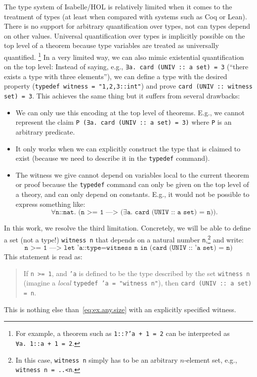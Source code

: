 \documentclass[11pt,a4paper]{article}
\begin{document}
The type system of Isabelle/HOL is relatively limited when it comes to the treatment of types (at least when compared with systems such as Coq or Lean).
There is no support for arbitrary quantification over types, not can types depend on other values.
Universal quantification over types is implicitly possible on the top level of a theorem because type variables are treated as universally quantified.%
\footnote{For example, a theorem such as \texttt{1::?'a + 1 = 2} can be interpreted as \texttt{∀a.~1::a + 1 = 2}.}
In a very limited way, we can also mimic existential quantification on the top level:
Instead of saying, e.g., \texttt{∃a.~card (UNIV :: a set) = 3} (``there exists a type with three elements''),
we can define a type with the desired property (\texttt{typedef witness = "{1,2,3::int}"}) and prove \texttt{card (UNIV :: witness set) = 3}. This achieves the same thing but it suffers from several drawbacks:
\begin{itemize}
\item We can only use this encoding at the top level of theorems. E.g., we cannot represent the claim \texttt{P (∃a.~card (UNIV :: a set) = 3)} where \texttt{P} is an arbitrary predicate.
\item It only works when we can explicitly construct the type that is claimed to exist (because we need to describe it in the \texttt{typedef} command).
\item The witness we give cannot depend on variables local to the current theorem or proof because the \texttt{typedef} command can only be given on the top level of a theory, and can only depend on constants.
  E.g., it would not be possible to express something like:
  \begin{equation}\label{eq:ex.any.size}
    \texttt{∀n::nat. (n >= 1 ---> (∃a.~card (UNIV :: a set) = n))}.
  \end{equation}
\end{itemize}
In this work, we resolve the third limitation.
Concretely, we will be able to define a set (not a type!) \texttt{witness n} that depends on a natural number \texttt{n},\footnote{In this case, \texttt{witness n} simply has to be an arbitrary $n$-element set, e.g., \texttt{witness n = {..<n}}.}
and write:
\[
\texttt{n >= 1 ---> let 'a::type=witness n in (card (UNIV :: 'a set) = n)} 
\]
This statement is read as:
\begin{quote}
  If \texttt{n >= 1}, and \texttt{'a} is defined to be the type described by the set \texttt{witness n}
  (imagine a \emph{local} \texttt{typedef 'a = "witness n"}), then \texttt{card (UNIV :: a set) = n}.
\end{quote}
This is nothing else than~\eqref{eq:ex.any.size} with an explicitly specified witness.
\end{document}
